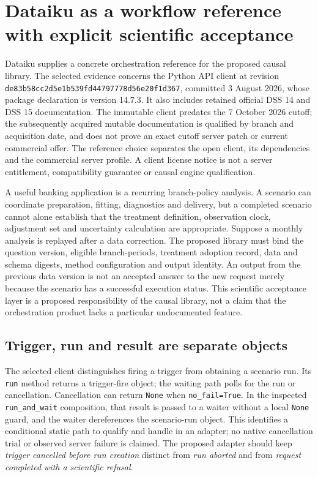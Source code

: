 \section{Dataiku as a workflow reference with explicit scientific acceptance}
\label{sec:exec25-dataiku-reuse}
Dataiku supplies a concrete orchestration reference for the proposed causal
library. The selected evidence concerns the Python API client at revision
\texttt{de83b58cc2d5e1b539fd}\allowbreak\texttt{44797778d56e20f1d367},
committed 3 August 2026, whose package declaration is version 14.7.3. It also
includes retained official DSS 14 and DSS 15 documentation. The immutable
client predates the 7 October 2026 cutoff; the subsequently acquired mutable
documentation is qualified by branch and acquisition date, and does not prove
an exact cutoff server patch or current commercial offer. The reference choice
separates the open client, its dependencies and the commercial server profile.
A client license notice is not a server entitlement, compatibility guarantee
or causal engine qualification.\citep{exec24_workflow_contracts_dataiku,exec23_dss_dss14_flow,exec23_dss_dss14_releases,exec23_dss_latest_flow,exec23_dss_latest_releases}

A useful banking application is a recurring branch-policy analysis. A scenario
can coordinate preparation, fitting, diagnostics and delivery, but a completed
scenario cannot alone establish that the treatment definition, observation
clock, adjustment set and uncertainty calculation are appropriate. Suppose a
monthly analysis is replayed after a data correction. The proposed library
must bind the question version, eligible branch-periods, treatment adoption
record, data and schema digests, method configuration and output identity.
An output from the previous data version is not an accepted answer to the new
request merely because the scenario has a successful execution status. This
scientific acceptance layer is a proposed responsibility of the causal library,
not a claim that the orchestration product lacks a particular undocumented
feature.\citep{exec25_dataiku_choice}

\subsection{Trigger, run and result are separate objects}
The selected client distinguishes firing a trigger from obtaining a scenario
run. Its \texttt{run} method returns a trigger-fire object; the waiting path
polls for the run or cancellation. Cancellation can return \texttt{None} when
\texttt{no\_fail=True}. In the inspected \texttt{run\_and\_wait} composition,
that result is passed to a waiter without a local \texttt{None} guard, and the
waiter dereferences the scenario-run object. This identifies a conditional
static path to qualify and handle in an adapter; no native cancellation trial
or observed server failure is claimed. The proposed adapter should keep
\emph{trigger cancelled before run creation} distinct from \emph{run aborted}
and from \emph{request completed with a scientific refusal}.\citep{exec24_workflow_contracts_dataiku}

